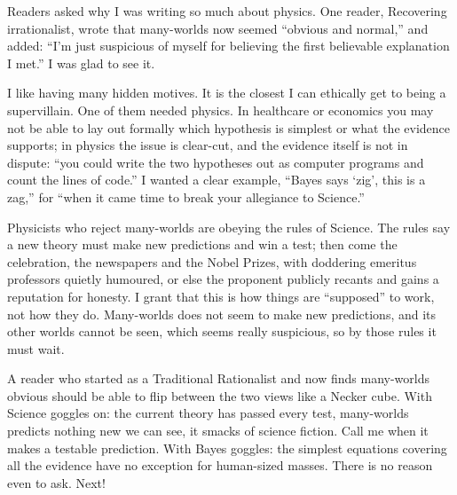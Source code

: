 
Readers asked why I was writing so much about physics. One reader, Recovering irrationalist, wrote that many-worlds now seemed ``obvious and normal,'' and added: ``I'm just suspicious of myself for believing the first believable explanation I met.'' I was glad to see it. 

I like having many hidden motives. It is the closest I can ethically get to being a supervillain. One of them needed physics. In healthcare or economics you may not be able to lay out formally which hypothesis is simplest or what the evidence supports; in physics the issue is clear-cut, and the evidence itself is not in dispute: ``you could write the two hypotheses out as computer programs and count the lines of code.''  I wanted a clear example, ``Bayes says `zig', this is a zag,'' for ``when it came time to break your allegiance to Science.''

Physicists who reject many-worlds are obeying the rules of Science. The rules say a new theory must make new predictions and win a test; then come the celebration, the newspapers and the Nobel Prizes, with doddering emeritus professors quietly humoured, or else the proponent publicly recants and gains a reputation for honesty. I grant that this is how things are ``supposed'' to work, not how they do. Many-worlds does not seem to make new predictions, and its other worlds cannot be seen, which seems really suspicious, so by those rules it must wait.

A reader who started as a Traditional Rationalist and now finds many-worlds obvious should be able to flip between the two views like a Necker cube. With Science goggles on: the current theory has passed every test, many-worlds predicts nothing new we can see, it smacks of science fiction. Call me when it makes a testable prediction. With Bayes goggles: the simplest equations covering all the evidence have no exception for human-sized masses. There is no reason even to ask. Next!

